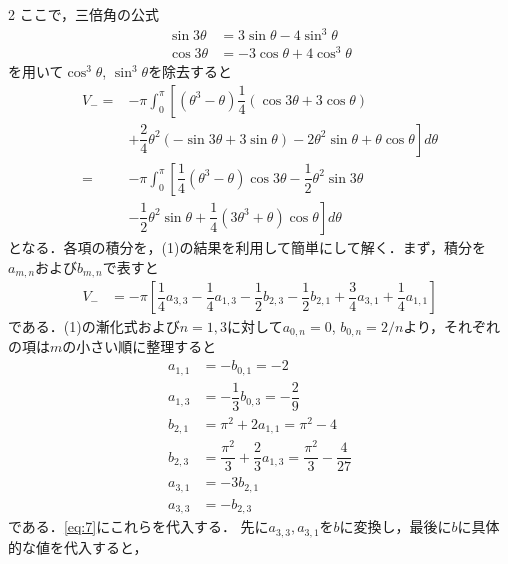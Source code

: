 \documentclass[../../main.tex]{subfiles}
\begin{document}
\begin{multicols}{2}
  ここで，三倍角の公式
  \begin{align}
    \sin 3\theta & = 3\sin\theta - 4 \sin^3\theta \\
    \cos 3\theta & =-3\cos\theta + 4 \cos^3\theta
  \end{align}
  を用いて$\cos^3\theta$, $\sin^3\theta$を除去すると
  \begin{align}
    V_{-}
    = & -\pi \int_{0}^{\pi} \left[
      \left(\theta^3-\theta\right)\dfrac{1}{4}\left(\cos 3\theta + 3\cos\theta \right)\right. \\
      & + \left. \dfrac{2}{4}\theta^2\left(-\sin 3\theta + 3\sin\theta \right)
    -2 \theta^2\sin\theta + \theta \cos\theta \right]  d\theta                             \\
    = & -\pi \int_{0}^{\pi} \left[
      \dfrac{1}{4}\left(\theta^3-\theta\right)\cos 3\theta
      -\dfrac{1}{2}\theta^2\sin 3\theta \right.                                               \\
      & \left. -\dfrac{1}{2}\theta^2\sin\theta
    +\dfrac{1}{4} \left(3\theta^3+\theta\right) \cos\theta \right]  d\theta
  \end{align}
  となる．各項の積分を，(1)の結果を利用して簡単にして解く．まず，積分を$a_{m,n}$および$b_{m,n}$で表すと
  \begin{align}
    V_{-}
    & = -\pi \left[ \dfrac{1}{4}a_{3,3}-\dfrac{1}{4}a_{1,3} - \dfrac{1}{2}b_{2,3} -\dfrac{1}{2}b_{2,1}+\dfrac{3}{4}a_{3,1}+\dfrac{1}{4}a_{1,1} \right] \label{eq:7}
  \end{align}
  である．(1)の漸化式および$n=1,3$に対して$a_{0,n}=0$, $b_{0,n}=2/n$より，それぞれの項は$m$の小さい順に整理すると
  \begin{align}
    a_{1,1} & = - b_{0,1} = -2                                                         \\
    a_{1,3} & = -\dfrac{1}{3} b_{0,3} = -\dfrac{2}{9}                                    \\
    b_{2,1} & = \pi^2 + 2 a_{1,1} = \pi^2 - 4                                          \\
    b_{2,3} & = \dfrac{\pi^2}{3} + \dfrac{2}{3} a_{1,3} = \dfrac{\pi^2}{3} - \dfrac{4}{27} \\
    a_{3,1} & = - 3 b_{2,1}                                                            \\
    a_{3,3} & = -b_{2,3}
  \end{align}
  である．\cref{eq:7}にこれらを代入する．
  先に$a_{3,3}, a_{3,1}$を$b$に変換し，最後に$b$に具体的な値を代入すると，
  \begin{align}

\end{align}
\end{multicols}
\end{document}
